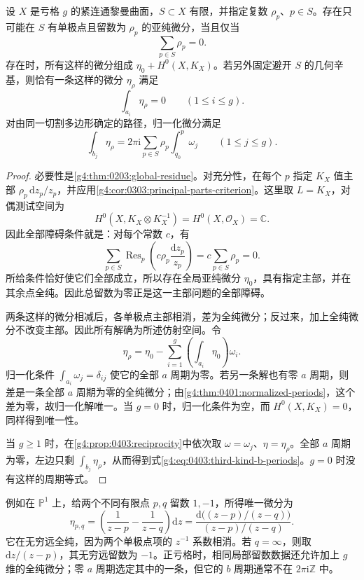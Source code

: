 \begin{proposition}
	\label{g4:prop:0403:third-kind}
	设 \(X\) 是亏格 \(g\) 的紧连通黎曼曲面，\(S\subset X\) 有限，并指定复数 \(\rho_p\)、\(p\in S\)。存在只可能在 \(S\) 有单极点且留数为 \(\rho_p\) 的亚纯微分，当且仅当
	\[
		\sum_{p\in S}\rho_p=0.
	\]
	存在时，所有这样的微分组成 \(\eta_0+H^0(X,K_X)\)。若另外固定避开 \(S\) 的几何辛基，则恰有一条这样的微分 \(\eta_\rho\) 满足
	\[
		\int_{a_i}\eta_\rho=0\qquad(1\le i\le g).
	\]
	对由同一切割多边形确定的路径，归一化微分满足
	\begin{equation}
		\label{g4:eq:0403:third-kind-b-periods}
		\int_{b_j}\eta_\rho
		=2\pi\mathrm{i}\sum_{p\in S}\rho_p
		\int_{q_0}^{p}\omega_j
		\qquad(1\le j\le g).
	\end{equation}
\end{proposition}
\begin{proof}
	必要性是\cref{g4:thm:0203:global-residue}。对充分性，在每个 \(p\) 指定 \(K_X\) 值主部 \(\rho_p\,\mathrm{d}z_p/z_p\)，并应用\cref{g4:cor:0303:principal-parts-criterion}。这里取 \(L=K_X\)，对偶测试空间为
	\[
		H^0(X,K_X\otimes K_X^{-1})
		=H^0(X,\mathcal O_X)=\mathbb C.
	\]
	因此全部障碍条件就是：对每个常数 \(c\)，有
	\[
		\sum_{p\in S}\operatorname{Res}_p
		\left(c\rho_p\frac{\mathrm{d}z_p}{z_p}\right)
		=c\sum_{p\in S}\rho_p=0.
	\]
	所给条件恰好使它们全部成立，所以存在全局亚纯微分 \(\eta_0\)，具有指定主部，并在其余点全纯。因此总留数为零正是这一主部问题的全部障碍。

	两条这样的微分相减后，各单极点主部相消，差为全纯微分；反过来，加上全纯微分不改变主部。因此所有解确为所述仿射空间。令
	\[
		\eta_\rho=\eta_0-
		\sum_{i=1}^g\left(\int_{a_i}\eta_0\right)\omega_i.
	\]
	归一化条件 \(\int_{a_i}\omega_j=\delta_{ij}\) 使它的全部 \(a\) 周期为零。若另一条解也有零 \(a\) 周期，则差是一条全部 \(a\) 周期为零的全纯微分；由\cref{g4:thm:0401:normalized-periods}，这个差为零，故归一化解唯一。当 \(g=0\) 时，归一化条件为空，而 \(H^0(X,K_X)=0\)，同样得到唯一性。

	当 \(g\ge1\) 时，在\cref{g4:prop:0403:reciprocity}中依次取 \(\omega=\omega_j\)、\(\eta=\eta_\rho\)。全部 \(a\) 周期为零，左边只剩 \(\int_{b_j}\eta_\rho\)，从而得到式\eqref{g4:eq:0403:third-kind-b-periods}。\(g=0\) 时没有这样的周期等式。
\end{proof}

例如在 \(\mathbb P^1\) 上，给两个不同有限点 \(p,q\) 留数 \(1,-1\)，所得唯一微分为
\[
	\eta_{p,q}
	=\left(\frac1{z-p}-\frac1{z-q}\right)\mathrm{d}z
	=\frac{\mathrm{d}\bigl((z-p)/(z-q)\bigr)}{(z-p)/(z-q)}.
\]
它在无穷远全纯，因为两个单极点项的 \(z^{-1}\) 系数相消。若 \(q=\infty\)，则取 \(\mathrm{d}z/(z-p)\)，其无穷远留数为 \(-1\)。正亏格时，相同局部留数数据还允许加上 \(g\) 维的全纯微分；零 \(a\) 周期选定其中的一条，但它的 \(b\) 周期通常不在 \(2\pi\mathrm{i}\mathbb Z\) 中。

